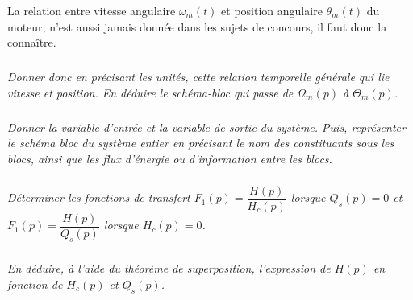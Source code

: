 \documentclass[10pt,fleqn]{article} %
\begin{document}
\begin{multicols}{2}
La relation entre vitesse angulaire $\omega_m(t)$ et position angulaire $\theta_m(t)$ du moteur, n'est aussi jamais donnée
dans les sujets de concours, il faut donc la connaître.

\subparagraph{}
\textit{Donner donc en précisant les unités, cette relation temporelle générale qui lie vitesse et
position. En déduire le schéma-bloc qui passe de $\Omega_m(p)$ à $\Theta_m(p)$.}
\ifprof
\begin{corrige}
\end{corrige}
\else
\fi



\subparagraph{}
\textit{Donner la variable d’entrée et la variable de sortie du système. Puis, représenter le schéma bloc du système entier en précisant le nom des constituants sous les blocs, ainsi que les flux
d’énergie ou d’information entre les blocs.}
\ifprof
\begin{corrige}
\end{corrige}
\else
\fi


\subparagraph{}
\textit{Déterminer les fonctions de transfert $F_1(p)=\dfrac{H(p)}{H_c(p)}$ lorsque $Q_s(p)=0$ et $F_1(p)=\dfrac{H(p)}{Q_s(p)}$ lorsque $H_c(p)=0$.}

\ifprof
\begin{corrige}
\end{corrige}
\else
\fi

\subparagraph{}
\textit{En déduire, à l’aide du théorème de superposition, l’expression de $H(p)$ en fonction de $H_c(p)$ et $Q_s(p)$.}

\ifprof
\begin{corrige}
\end{corrige}
\else
\fi



\ifprof
\else
\end{multicols}
\end{document}
